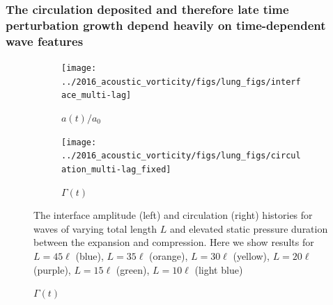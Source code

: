   \begin{frame}
    \frametitle{The circulation deposited and therefore late time perturbation growth depend heavily on time-dependent wave features}
    \begin{figure}
      \centering
      \begin{subfigure}{0.49\textwidth}
        \texttt{[image: ../2016\_acoustic\_vorticity/figs/lung\_figs/interface\_multi-lag]}
        \caption{$a(t)/a_0$}
      \end{subfigure}
      \begin{subfigure}{0.49\textwidth}
        \texttt{[image: ../2016\_acoustic\_vorticity/figs/lung\_figs/circulation\_multi-lag\_fixed]}
        \caption{$\Gamma(t)$}
      \end{subfigure}
      \begin{flushleft}
        {\footnotesize
        The interface amplitude (left) and circulation (right) histories
        for waves of varying total length $L$ and elevated static pressure
        duration between the expansion and compression. Here we show
        results for $L=45\ell$ (blue), $L=35\ell$ (orange), $L=30\ell$
        (yellow), $L=20\ell$ (purple), $L=15\ell$ (green), $L=10\ell$
        (light blue)
      }
      \end{flushleft}
      \label{fig:trapz_circ_interface_multi-lag}
    \end{figure}
  \end{frame}
  
  

